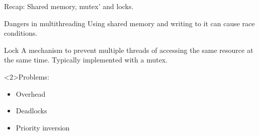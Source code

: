 \begin{frame}{Recap: Shared memory, mutex' and locks.}
	\begin{block}{Dangers in multithreading}
	Using shared memory and writing to it can cause \textcolor{ReneOrange}{race conditions}.
	\end{block}
	\begin{block}{Lock}
		A mechanism to prevent multiple threads of accessing the same resource at the same time. 
		Typically implemented with a \textcolor{ReneOrange}{mutex}. 
	\end{block}

	\begin{exampleblock}{Problems:}
		\begin{itemize}
			\item Overhead
			\item Deadlocks
			\item Priority inversion
		\end{itemize}
	\end{exampleblock}

\end{frame}
